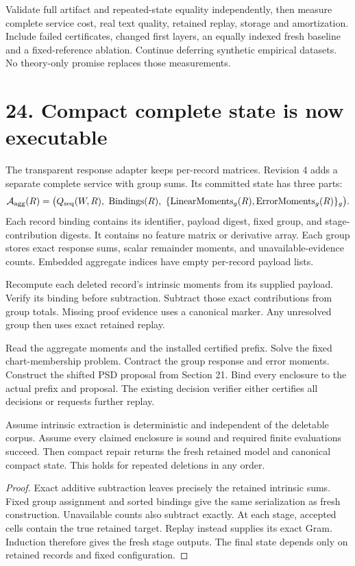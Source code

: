  Validate full artifact and repeated-state equality independently, then measure complete service cost, real text quality, retained replay, storage and amortization. Include failed certificates, changed first layers, an equally indexed fresh baseline and a fixed-reference ablation. Continue deferring synthetic empirical datasets. No theory-only promise replaces those measurements.

\newpage
\section*{24. Compact complete state is now executable}
The transparent response adapter keeps per-record matrices. Revision 4 adds a separate complete service with group sums. Its committed state has three parts:
\[
 \mathcal A_{\rm agg}(R)=\bigl(Q_{\rm seq}(W,R),\ \mathrm{Bindings}(R),\
          \{\mathrm{LinearMoments}_g(R),\mathrm{ErrorMoments}_g(R)\}_g\bigr).
\]
Each record binding contains its identifier, payload digest, fixed group, and stage-contribution digests. It contains no feature matrix or derivative array. Each group stores exact response sums, scalar remainder moments, and unavailable-evidence counts. Embedded aggregate indices have empty per-record payload lists.

 Recompute each deleted record's intrinsic moments from its supplied payload. Verify its binding before subtraction. Subtract those exact contributions from group totals. Missing proof evidence uses a canonical marker. Any unresolved group then uses exact retained replay.

 Read the aggregate moments and the installed certified prefix. Solve the fixed chart-membership problem. Contract the group response and error moments. Construct the shifted PSD proposal from Section 21. Bind every enclosure to the actual prefix and proposal. The existing decision verifier either certifies all decisions or requests further replay.

\begin{theorem}
Assume intrinsic extraction is deterministic and independent of the deletable corpus. Assume every claimed enclosure is sound and required finite evaluations succeed. Then compact repair returns the fresh retained model and canonical compact state. This holds for repeated deletions in any order.
\end{theorem}
\begin{proof}
Exact additive subtraction leaves precisely the retained intrinsic sums. Fixed group assignment and sorted bindings give the same serialization as fresh construction. Unavailable counts also subtract exactly. At each stage, accepted cells contain the true retained target. Replay instead supplies its exact Gram. Induction therefore gives the fresh stage outputs. The final state depends only on retained records and fixed configuration.
\end{proof}

